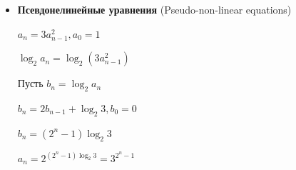 \documentclass[12pt]{article}
\begin{document}
\begin{itemize}
\begin{enumerate}
            \item $r(0) = 3 \Longrightarrow \alpha = 3$
        \end{enumerate}

        \Ex $T(n) = 2T(n - 1) + 1, \quad T(0) = 0$

        \begin{enumerate}
            \item $(E - 2)T(n) = 1$

            \item $(E - 2)$ не аннигилирует $T(n)$, остается $1$. Тогда добавим аннигилятор $(E - 1)$, получим, что $(E - 1)(E - 2)$ аннигилирует $T(n)$

            \item Разложение не требуется

            \item $T(n) = \alpha \cdot 2^n + \beta$ -- общее решение

            \item $T(0) = 0 = \alpha \cdot 2^0 + \beta$

            $T(1) = 1 = \alpha \cdot 2^1 + \beta$

            $\alpha = 1, \beta = -1$
        \end{enumerate}

        \mediumvspace

        \item \textbf{Псевдонелинейные уравнения} (Pseudo-non-linear equations)

        \Ex $a_n = 3a_{n - 1}^2, a_0 = 1$

        $\log_2 a_n = \log_2 (3a_{n - 1}^2)$

        Пусть $b_n = \log_2 a_n$

        $b_n = 2b_{n - 1} + \log_2 3, b_0 = 0$

        $b_n = (2^n - 1)\log_2 3$

        $a_n = 2^{(2^n - 1)\log_2 3} = 3^{2^n - 1}$

    \end{itemize}
\end{document}
